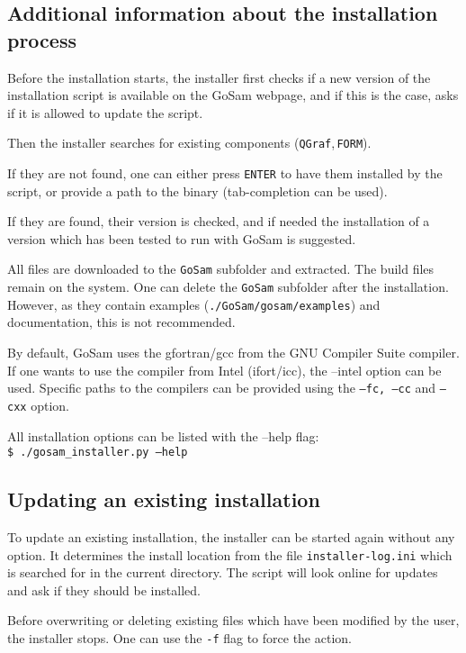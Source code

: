 \documentclass[11pt,a4paper]{refrep}
\newcommand{\gosam}{{\sc GoSam}\xspace}
\newcommand{\qgraf}{{\tt QGraf}\xspace}
\begin{document}
\subsection{Additional information about the installation process}

Before the installation starts, the installer first checks if a new version of
the installation script is available on the \gosam webpage,  
and if this is the case, asks if it is allowed to update the script.

Then the installer searches for existing components (\qgraf,\,{\tt FORM}).

If they are not found, one can either 
press {\tt ENTER} to have them installed by the script, or provide a path to
the binary (tab-completion can be used).

If they are found, their version is checked, 
and if needed the installation
of a version which has been tested to run with \gosam is suggested.

All files are downloaded to the {\tt GoSam} subfolder and extracted.
The build files remain on the system. One can delete the {\tt GoSam} subfolder after
the installation. However, as they contain examples ({\tt ./GoSam/gosam/examples})
and documentation, this is not recommended.


By default, \gosam uses the gfortran/gcc from the GNU Compiler Suite compiler.
If one wants to use the compiler from Intel (ifort/icc), the --intel option can be used.
Specific paths to the compilers can be provided using the {\tt --fc, --cc} and 
{\tt --cxx} option.

All installation options can be listed with the --help flag:\\
{\tt \$ ./gosam\_installer.py --help}


\subsection{Updating an existing installation}

To update an existing installation, the installer can be started again without
any option. It determines the install location from the file {\tt installer-log.ini}
which is searched for in the current directory. The script will look 
online for updates and ask if they should be installed.

Before overwriting or deleting existing files which have been modified by the user, 
the installer stops. One can use the {\tt -f} flag to force the action.
\end{document}
